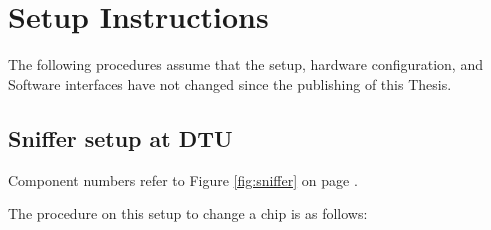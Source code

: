 
\chapter{Setup Instructions}\label{app:instructions}

The following procedures assume that the setup, hardware configuration, and Software interfaces have not changed since the publishing of this Thesis.

\section{Sniffer setup at DTU}\label{app:sniffer}

Component numbers refer to Figure \ref{fig:sniffer} on page \pageref{fig:sniffer}.

The procedure on this setup to change a chip is as follows:
